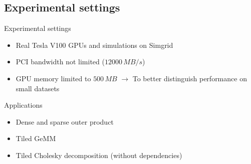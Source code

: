 \documentclass{libs/ufc_format}
\begin{document}
\subsection{Experimental settings}
\begin{frame}{Experimental settings}

        \begin{block}{}
            \begin{itemize}
				\item Real Tesla V100 GPUs and simulations on Simgrid
				\item PCI bandwidth not limited ($12000\,MB/s$)
				\item GPU memory limited to $500\,MB$ $\rightarrow$ To better distinguish performance on small datasets
			\end{itemize}
		\end{block}
			\begin{block}{Applications}
			\begin{itemize}
				\item Dense and sparse outer product 
				\item Tiled GeMM
				\item Tiled Cholesky decomposition (without dependencies)
			\end{itemize}
			\end{block}
\end{frame}

\end{document}

